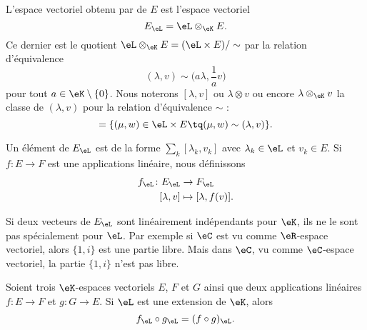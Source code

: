 \begin{definition}
	L'espace vectoriel obtenu par  de \( E\) est l'espace vectoriel
	\begin{equation}
		E_{\eL}=\eL\otimes_{\eK}E.
	\end{equation}
	Ce dernier est le quotient \( \eL\otimes_{\eK}E=(\eL\times E)/\sim\) par la relation d'équivalence
	\begin{equation}
		(\lambda,v)\sim\big( a\lambda,\frac{1}{ a }v \big)
	\end{equation}
    pour tout \( a\in \eK\setminus\{ 0 \}\). Nous noterons \( [\lambda,v]\) ou \( \lambda\otimes v\) ou encore \( \lambda\otimes_{\eK}v\) la classe de \( (\lambda,v)\) pour la relation d'équivalence \( \sim\) :
	\begin{equation}
		[\lambda, v]=\{ (\mu, w)\in \eL\times E\tq (\mu,w)\sim(\lambda,v) \}.
	\end{equation}
\end{definition}
Un élément de \( E_{\eL}\) est de la forme \( \sum_k[\lambda_k,v_k]\) avec \( \lambda_k\in \eL\) et \( v_k\in E\). Si \( f\colon E\to F\) est une applications linéaire, nous définissons
\begin{equation}        \label{EQooYGVHooHYbMHX}
	\begin{aligned}
		f_{\eL}\colon E_{\eL} & \to F_{\eL}             \\
		[\lambda,v]           & \mapsto [\lambda,f(v)].
	\end{aligned}
\end{equation}

\begin{remark}
	Si deux vecteurs de \( E_{\eL}\) sont linéairement indépendants pour \( \eK\), ils ne le sont pas spécialement pour \( \eL\). Par exemple si \( \eC\) est vu comme \( \eR\)-espace vectoriel, alors \( \{ 1,i \}\) est une partie libre. Mais dans \( \eC\), vu comme \( \eC\)-espace vectoriel, la partie \( \{ 1,i \}\) n'est pas libre.
\end{remark}

\begin{lemma}       \label{LEMooJIGTooMqiJSN}
	Soient trois \( \eK\)-espaces vectoriels \( E\), \( F\) et \( G\) ainsi que deux applications linéaires \( f\colon E\to F\) et \( g\colon G\to E\). Si \( \eL\) est une extension de \( \eK\), alors
	\begin{equation}
		f_{\eL}\circ g_{\eL}=(f\circ g)_{\eL}.
	\end{equation}
\end{lemma}

